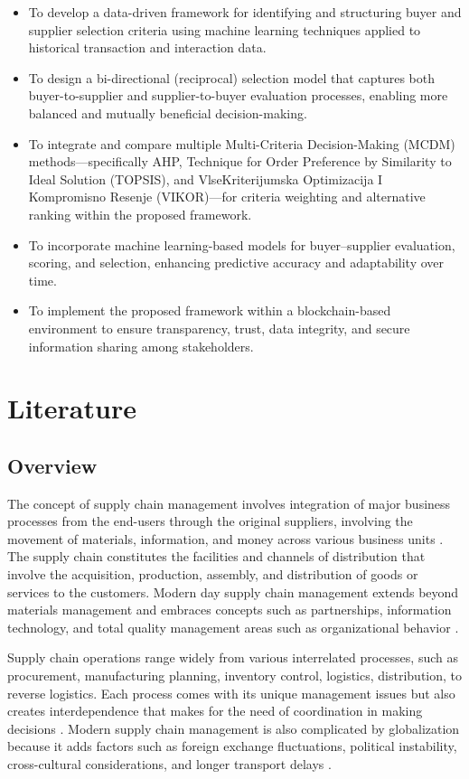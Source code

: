 \documentclass[11pt]{article}
\begin{document}
\begin{itemize}
\item To develop a data-driven framework for identifying and structuring buyer and supplier selection criteria using machine learning techniques applied to historical transaction and interaction data.
\item To design a bi-directional (reciprocal) selection model that captures both buyer-to-supplier and supplier-to-buyer evaluation processes, enabling more balanced and mutually beneficial decision-making.
\item To integrate and compare multiple Multi-Criteria Decision-Making (MCDM) methods---specifically AHP, Technique for Order Preference by Similarity to Ideal Solution (TOPSIS), and VlseKriterijumska Optimizacija I Kompromisno Resenje (VIKOR)---for criteria weighting and alternative ranking within the proposed framework.
\item To incorporate machine learning-based models for buyer--supplier evaluation, scoring, and selection, enhancing predictive accuracy and adaptability over time.
\item To implement the proposed framework within a blockchain-based environment to ensure transparency, trust, data integrity, and secure information sharing among stakeholders.
\end{itemize}

\newpage
\section{Literature}

\subsection{Overview}

The concept of supply chain management involves integration of major business processes from the end-users through the original suppliers, involving the movement of materials, information, and money across various business units \cite{ref20}. The supply chain constitutes the facilities and channels of distribution that involve the acquisition, production, assembly, and distribution of goods or services to the customers. Modern day supply chain management extends beyond materials management and embraces concepts such as partnerships, information technology, and total quality management areas such as organizational behavior \cite{ref20}.

Supply chain operations range widely from various interrelated processes, such as procurement, manufacturing planning, inventory control, logistics, distribution, to reverse logistics. Each process comes with its unique management issues but also creates interdependence that makes for the need of coordination in making decisions \cite{ref20}. Modern supply chain management is also complicated by globalization because it adds factors such as foreign exchange fluctuations, political instability, cross-cultural considerations, and longer transport delays \cite{ref21}.
\end{document}
